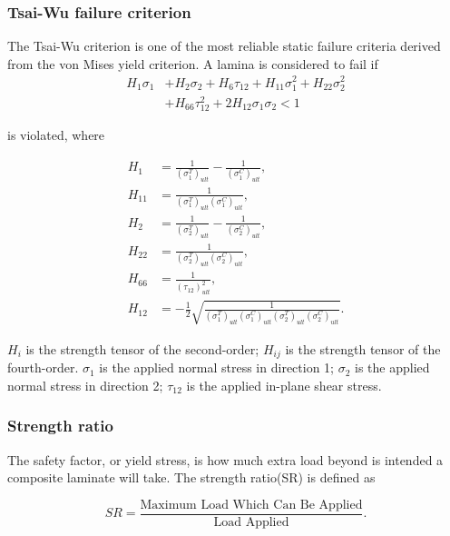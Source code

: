 \subsubsection{Tsai-Wu failure criterion}
The Tsai-Wu criterion is one of the most reliable static failure criteria derived from the von
Mises yield criterion.  
A lamina is considered to fail
if \begin{equation} \label{eq:tsai_wu}
\begin{split}
	H_1 \sigma_1  & + H_2 \sigma_2 + H_6 \tau_{12} + H_{11}\sigma_1^2 + H_{22} \sigma_2^2 \\
				  & + H_{66}  \tau_{12}^2 + 2H_{12}\sigma_1\sigma_2 < 1
\end{split}
\end{equation}

is violated, where

\begin{equation}
	\begin{split}
		H_{1}&=\frac{1}{\left(\sigma_{1}^{T}\right)_{u l t}}-\frac{1}{\left(\sigma_{1}^{C}\right)_{u l t}}\textstyle{,} \\
		H_{11}&=\frac{1}{\left(\sigma_{1}^{T}\right)_{u l t}\left(\sigma_{1}^{C}\right)_{u l t}} \textstyle{,}\\
		H_{2}&=\frac{1}{\left(\sigma_{2}^{T}\right)_{u l t}}-\frac{1}{\left(\sigma_{2}^{C}\right)_{u l t}} \textstyle{,}\\
		H_{22}&=\frac{1}{\left(\sigma_{2}^{T}\right)_{u l t}\left(\sigma_{2}^{C}\right)_{u l t}} \textstyle{,}\\
		H_{66}&=\frac{1}{\left(\tau_{12}\right)_{u l t}^{2}} \textstyle{,}\\
		H_{12}&=-\frac{1}{2} \sqrt{\frac{1}{\left(\sigma_{1}^{T}\right)_{u l
		t}\left(\sigma_{1}^{C}\right)_{u l t}\left(\sigma_{2}^{T}\right)_{u l
		t}\left(\sigma_{2}^{C}\right)_{u l t}}}\textstyle{.}
	\end{split}
\end{equation}

$H_i$ is the strength tensor of the second-order; $H_{ij}$ is the strength
tensor of the fourth-order. $\sigma_1$ is the applied normal stress in 
direction 1; $\sigma_2$ is the applied normal stress in direction 2; 
$\tau_{12}$ is the applied in-plane shear stress.




\subsubsection{Strength ratio}
The safety factor, or yield stress, is how much extra load beyond is intended a
composite laminate will take. The strength ratio(SR) is defined as 

\begin{equation}
	\label{eq:sr}S R=\frac{\text {Maximum Load Which Can Be Applied}}{\text {Load Applied}}\textstyle{.}
\end{equation}

